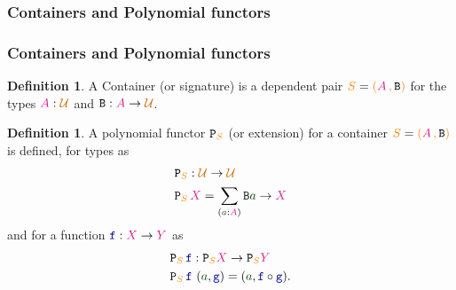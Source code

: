 \documentclass[xelatex,mathserif,serif,notheorems]{beamer} %
\theoremstyle{plain} %
\theoremstyle{definition}
\newtheorem{defn}[thm]{Definition}%
\theoremstyle{remark}
\newcommand*{\term}[1]{\textcolor{green!30!black}{#1}} %
\newcommand*{\type}[1]{\textcolor{magenta!90!black}{#1}}
\newcommand*{\container}[1]{\textcolor{orange}{#1}}
\newcommand*{\containerpair}[2]{\ensuremath{\colorlet{savedleftcolor}{.}\color{orange}\left(\color{savedleftcolor}#1\,\textcolor{orange}{\mathbf{,}}\,#2\color{orange}\right)\color{savedleftcolor}}}
\newcommand*{\universe}[1]{\textcolor{orange!80!black}{#1}}
\newcommand*{\function}[1]{\textcolor{blue!60!black}{\ensuremath{\mathtt{#1}}}}
\newcommand*{\typeformer}[1]{\ensuremath{\mathtt{#1}}}
\newcommand*{\functor}[1]{\ensuremath{\mathbf{\mathtt{#1}}}}
\newcommand{\setlengths}{
  \setlength{\abovedisplayskip}{4pt}
  \setlength{\belowdisplayskip}{4pt}
  \setlength{\abovedisplayshortskip}{2pt}
  \setlength{\belowdisplayshortskip}{2pt}
}
\begin{document}
\subsubsection{Containers and Polynomial functors}
\begin{frame}
  \frametitle{Containers and Polynomial functors}
  \begin{defn}\setlengths
    A Container (or signature) is a dependent pair \(\container{S} = \containerpair{\type{A}}{\typeformer{B}}\) for the types \(\type{A} : \universe{\mathcal{U}}\) and \(\typeformer{B} : \type{A} \rightarrow \universe{\mathcal{U}}\). 
  \end{defn}
  \begin{defn}\setlengths
    A polynomial functor \(\functor{P}_{\container{S}}\) (or extension) for a container \(\container{S} = \containerpair{\type{A}}{\typeformer{B}}\) is defined, for types as
    \begin{equation}
      \begin{aligned}
        &\functor{P}_{\container{S}} : \universe{\mathcal{U}} \rightarrow \universe{\mathcal{U}} \\
        &\functor{P}_{\container{S}}\,\type{X} = \sum_{(\term{a} : \type{A})} \typeformer{B}\term{a} \rightarrow \type{X}
      \end{aligned}
    \end{equation}
    and for a function \(\function{f} : \type{X} \rightarrow \type{Y}\) as
    \begin{equation}
      \begin{aligned}
        &\functor{P}_{\container{S}}\,\function{f} : \functor{P}_{\container{S}}\type{X} \rightarrow \functor{P}_{\container{S}}\type{Y} \\
        &\functor{P}_{\container{S}}\,\function{f}~(\term{a},\function{g}) = (\term{a}, \function{f} \circ \function{g}).
      \end{aligned}
    \end{equation}
  \end{defn}
\end{frame}
\end{document}
